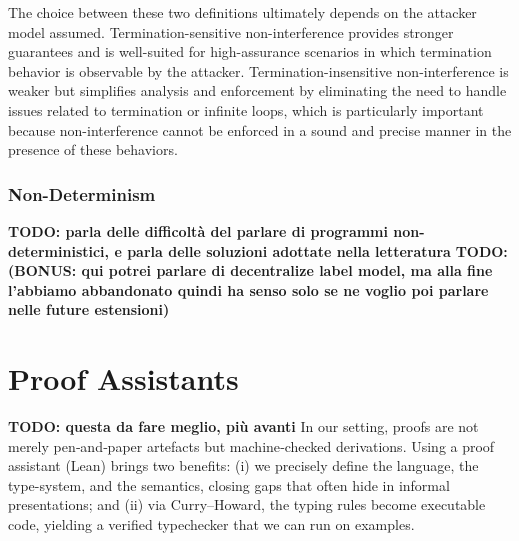 \documentclass[12pt,a4paper,twoside]{book}
\begin{document}
The choice between these two definitions ultimately depends on the attacker model assumed. Termination-sensitive non-interference provides stronger guarantees and is well-suited for high-assurance scenarios in which termination behavior is observable by the attacker.
Termination-insensitive non-interference is weaker but simplifies analysis and enforcement by eliminating the need to handle issues related to termination or infinite loops, which is particularly important because non-interference cannot be enforced in a sound and precise manner in the presence of these behaviors\cite{ngo2018impossibility}.

\subsubsection{Non-Determinism}
\textbf{TODO: parla delle difficoltà del parlare di programmi non-deterministici, e parla delle soluzioni adottate nella letteratura}
\textbf{TODO: (BONUS: qui potrei parlare di decentralize label model, ma alla fine l'abbiamo abbandonato quindi ha senso solo se ne voglio poi parlare nelle future estensioni) }


\section{Proof Assistants}
\textbf{TODO: questa da fare meglio, più avanti}
In our setting, proofs are not merely pen‑and‑paper artefacts but machine‑checked derivations.
Using a proof assistant (Lean) brings two benefits: (i) we precisely define the language, the type-system, and the semantics, closing gaps that often hide in informal presentations; and (ii) via Curry–Howard, the typing rules become executable code, yielding a verified typechecker that we can run on examples.
\end{document}
